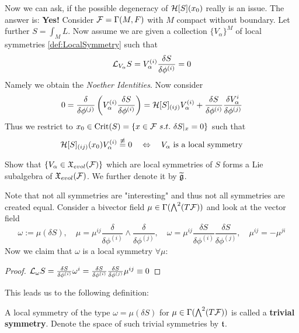 Now we can ask, if the possible degeneracy of ${\mathcal{H}}[S](x_0)$ really is an issue. The answer is: \textbf{Yes!} Consider ${\mathcal{F}} = \Gamma(M, F)$ with $M$ compact without boundary. Let further $S = \int_M L$. Now assume we are given a collection $\{V_\alpha\}^M$ of local symmetries \ref{def:LocalSymmetry} such that
\begin{equation}\lie{V_\alpha} S = V_\alpha^{(i)} \frac{\delta S}{\delta \phi^{(i)}} = 0 \end{equation}
Namely we obtain the \emph{Noether Identities}. Now consider
\begin{align}
  0 = \frac{\delta}{\delta \phi^{(j)}} \left( V_\alpha^{(i)} \frac{\delta S}{\delta \phi^{(i)}} \right) = \HH[S]_{(ij)} V^{(i)}_\alpha + \frac{\delta S}{\delta \phi^{(i)}} \frac{\delta V_\alpha^i}{\delta \phi^{(j)}}
\end{align}
Thus we restrict to $x_0 \in \operatorname{Crit}(S) = \{x \in {\mathcal{F}} \ s.t. \ \delta S|_x = 0\}$ such that
\begin{equation}
  {\mathcal{H}}[S]_{(ij)}(x_0) V^{(i)}_\alpha \overset{\not\equiv}{=} 0 \quad \Leftrightarrow \quad V_\alpha \ \text{is a local symmetry}
\end{equation}
\begin{ex}
  Show that $\{V_\alpha \in \mathfrak{X}_{evol}({\mathcal{F}})\}$ which are local symmetries of $S$ forms a Lie subalgebra of $\mathfrak{X}_{evol}({\mathcal{F}})$. We further denote it by $\widetilde{\mathfrak{g}}$.
\end{ex}
Note that not all symmetries are "interesting" and thus not all symmetries are created equal. Consider a bivector field $\mu \in \Gamma(\bigwedge^2 (T{\mathcal{F}}))$ and look at the vector field
\begin{equation}
  \omega := \mu(\delta S), \quad \mu = \mu^{ij} \frac{\delta}{\delta \phi^{(i)}} \wedge \frac{\delta}{\delta \phi^{(j)}}, \quad \omega = \mu^{ij} \frac{\delta S}{\delta \phi^{(i)}} \frac{\delta S}{\delta \phi^{(j)}}, \quad \mu^{ij} = - \mu^{ji}
\end{equation}
Now we claim that $\omega$ is a local symmetry $\forall \mu$:
\begin{proof}
  $\lie{\omega} S = \frac{\delta S}{\delta \phi^{(i)}} \omega^i = \frac{\delta S}{\delta \phi^{(i)}} \frac{\delta S}{\delta \phi^{(j)}} \mu^{ij} \equiv 0$
\end{proof}
This leads us to the following definition:

\begin{definition}
  A local symmetry of the type $\omega = \mu(\delta S)$ for $\mu \in \Gamma(\bigwedge^2 (T{\mathcal{F}}))$ is called a \textbf{trivial symmetry}. Denote the space of such trivial symmetries by $\mathfrak{t}$.
\end{definition}

